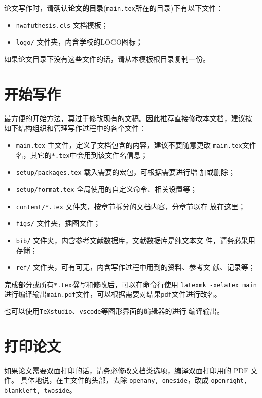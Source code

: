 论文写作时，请确认\textbf{论文的目录}(\verb|main.tex|所在的目录)下有以下文件：
\begin{itemize}
  \item \verb|nwafuthesis.cls| 文档模板；
  \item \verb|logo/| 文件夹，内含学校的LOGO图标；
\end{itemize}

如果论文目录下没有这些文件的话，请从本模板根目录复制一份。

\section{开始写作}

最方便的开始方法，莫过于修改现有的文稿。因此推荐直接修改本文档，建议按
如下结构组织和管理写作过程中的各个文件：
\begin{itemize}
  \item \verb|main.tex| 主文件，定义了文档包含的内容，建议不要随意更改
    \verb|main.tex|文件名，其它的\verb|*.tex|中会用到该文件名信息；
  \item \verb|setup/packages.tex| 载入需要的宏包，可根据需要进行增
    加或删除；
  \item \verb|setup/format.tex| 全局使用的自定义命令、相关设置等；  
  \item \verb|content/*.tex| 文件夹，按章节拆分的文档内容，分章节以存
    放在这里；
  \item \verb|figs/| 文件夹，插图文件；  
  \item \verb|bib/| 文件夹，内含参考文献数据库，文献数据库是纯文本文
    件，请务必采用存储；
  \item \verb|ref/| 文件夹，可有可无，内含写作过程中用到的资料、参考文
    献、记录等；  
\end{itemize}

完成部分或所有\verb|*.tex|撰写和修改后，可以在命令行使用 \verb|latexmk -xelatex main|
进行编译输出\verb|main.pdf|文件，可以根据需要对结果\texttt{pdf}文件进行改名。

也可以使用\texttt{TeXstudio}、\texttt{vscode}等图形界面的编辑器的进行
编译输出。

\section{打印论文}

如果论文需要双面打印的话，请务必修改文档类选项，编译双面打印用的 PDF 文件。
具体地说，在主文件的头部，去除 \texttt{openany, oneside}，改成 \texttt{openright, blankleft, twoside}。

